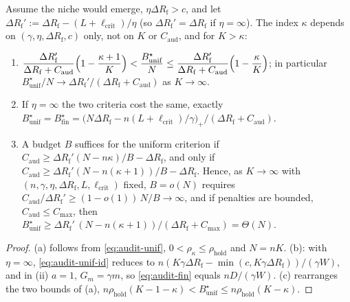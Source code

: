 \begin{corollary}
\label{cor:audit-tradeoff}
Assume the niche would emerge, $\eta\Delta R_{\mathrm f}>c$, and let
$\Delta R_{\mathrm f}':=\Delta R_{\mathrm f}-(L+\ell_{\mathrm{crit}})/\eta$ (so $\Delta R_{\mathrm f}'=\Delta R_{\mathrm f}$ if
$\eta=\infty$). The index $\kappa$ depends on $(\gamma,\eta,\Delta R_{\mathrm f},c)$ only,
not on $K$ or $C_{\mathrm{aud}}$, and for $K>\kappa$:
\begin{enumerate}
\item[\textup{(a)}] $\displaystyle
 \frac{\Delta R_{\mathrm f}'}{\Delta R_{\mathrm f}+C_{\mathrm{aud}}}\Bigl(1-\frac{\kappa+1}{K}\Bigr)<
 \frac{B^\star_{\mathrm{unif}}}{N}\le\frac{\Delta R_{\mathrm f}'}{\Delta R_{\mathrm f}+C_{\mathrm{aud}}}\Bigl(1-\frac{\kappa}{K}\Bigr)$;
 in particular $B^\star_{\mathrm{unif}}/N\to\Delta R_{\mathrm f}'/(\Delta R_{\mathrm f}+C_{\mathrm{aud}})$ as
 $K\to\infty$.
\item[\textup{(b)}] If $\eta=\infty$ the two criteria cost the same, exactly
 $B^\star_{\mathrm{unif}}=B^\star_{\mathrm{fin}}
 =\bigl(N\Delta R_{\mathrm f}-n(L+\ell_{\mathrm{crit}})/\gamma\bigr)_+/(\Delta R_{\mathrm f}+C_{\mathrm{aud}})$.
\item[\textup{(c)}] A budget $B$ suffices for the uniform criterion if
 $C_{\mathrm{aud}}\ge\Delta R_{\mathrm f}'(N-n\kappa)/B-\Delta R_{\mathrm f}$, and only if
 $C_{\mathrm{aud}}\ge\Delta R_{\mathrm f}'(N-n(\kappa+1))/B-\Delta R_{\mathrm f}$. Hence, as $K\to\infty$ with
 $(n,\gamma,\eta,\Delta R_{\mathrm f},L,\ell_{\mathrm{crit}})$ fixed, $B=o(N)$ requires
 $C_{\mathrm{aud}}/\Delta R_{\mathrm f}'\ge(1-o(1))\,N/B\to\infty$, and if penalties are bounded,
 $C_{\mathrm{aud}}\le C_{\max}$, then
 $B^\star_{\mathrm{unif}}\ge\Delta R_{\mathrm f}'\,(N-n(\kappa+1))/(\Delta R_{\mathrm f}+C_{\max})=\Theta(N)$.
\end{enumerate}
\end{corollary}
\begin{proof}
(a) follows from \eqref{eq:audit-unif}, $0<\rho_\kappa\le\rho_{\mathrm{hold}}$
and $N=nK$. (b): with $\eta=\infty$, \eqref{eq:audit-unif-id} reduces to
$n(K\gamma\Delta R_{\mathrm f}-\min(c,K\gamma\Delta R_{\mathrm f}))/(\gamma W)$, and in (ii) $a=1$,
$G_m=\gamma m$, so \eqref{eq:audit-fin} equals $nD/(\gamma W)$. (c) rearranges
the two bounds of (a), $n\rho_{\mathrm{hold}}(K-1-\kappa)<B^\star_{\mathrm{unif}}
\le n\rho_{\mathrm{hold}}(K-\kappa)$.
\end{proof}

